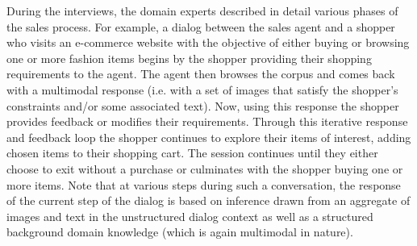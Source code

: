 \documentclass[letterpaper]{article} %
\begin{document}
During the interviews, the domain experts described in detail various phases of the sales process. For example, a dialog between the sales agent and a shopper who visits an e-commerce website with the objective of either buying or browsing one or more fashion items begins by the shopper providing their shopping requirements to the agent. The agent then browses the corpus and comes back with a multimodal response (i.e. with a set of images that satisfy the shopper's constraints and/or some associated text). Now, using this response the shopper provides feedback or modifies their requirements. Through this iterative response and feedback loop the shopper continues to explore their items of interest, adding chosen items to their shopping cart. The session continues until they either choose to exit without a purchase or culminates with the shopper buying one or more items. Note that at various steps during such a conversation, the response of the current step of the dialog is based on inference drawn from an aggregate of images and text in the unstructured dialog context as well as a structured background domain knowledge (which is again multimodal in nature).
\end{document}
